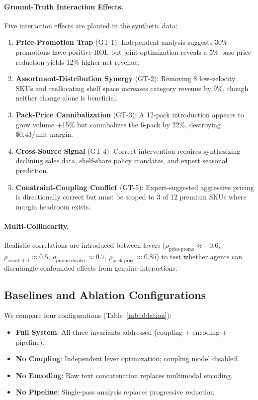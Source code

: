 \paragraph{Ground-Truth Interaction Effects.}
Five interaction effects are planted in the synthetic data:
\begin{enumerate}
    \item \textbf{Price-Promotion Trap} (GT-1): Independent analysis suggests 30\% promotions have positive ROI, but joint optimization reveals a 5\% base-price reduction yields 12\% higher net revenue.
    \item \textbf{Assortment-Distribution Synergy} (GT-2): Removing 8 low-velocity SKUs and reallocating shelf space increases category revenue by 9\%, though neither change alone is beneficial.
    \item \textbf{Pack-Price Cannibalization} (GT-3): A 12-pack introduction appears to grow volume +15\% but cannibalizes the 6-pack by 22\%, destroying \$0.43/unit margin.
    \item \textbf{Cross-Source Signal} (GT-4): Correct intervention requires synthesizing declining sales data, shelf-share policy mandates, and expert seasonal prediction.
    \item \textbf{Constraint-Coupling Conflict} (GT-5): Expert-suggested aggressive pricing is directionally correct but must be scoped to 3 of 12 premium SKUs where margin headroom exists.
\end{enumerate}

\paragraph{Multi-Collinearity.}
Realistic correlations are introduced between levers ($\rho_{\text{price-promo}} \approx -0.6$, $\rho_{\text{assort-dist}} \approx 0.5$, $\rho_{\text{promo-display}} \approx 0.7$, $\rho_{\text{pack-price}} \approx 0.85$) to test whether agents can disentangle confounded effects from genuine interactions.

\subsection{Baselines and Ablation Configurations}

We compare four configurations (Table~\ref{tab:ablation}):
\begin{itemize}
    \item \textbf{Full System}: All three invariants addressed (coupling + encoding + pipeline).
    \item \textbf{No Coupling}: Independent lever optimization; coupling model disabled.
    \item \textbf{No Encoding}: Raw text concatenation replaces multimodal encoding.
    \item \textbf{No Pipeline}: Single-pass analysis replaces progressive reduction.
\end{itemize}

